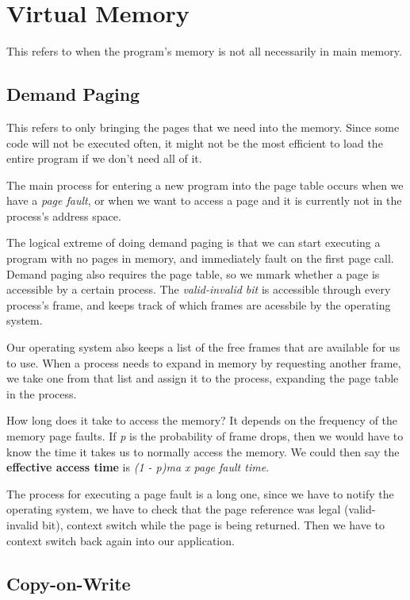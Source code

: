 \hypertarget{virtual-memory}{%
\section{Virtual Memory}\label{virtual-memory}}

This refers to when the program's memory is not all necessarily in main
memory.

\hypertarget{demand-paging}{%
\subsection{Demand Paging}\label{demand-paging}}

This refers to only bringing the pages that we need into the memory.
Since some code will not be executed often, it might not be the most
efficient to load the entire program if we don't need all of it.

The main process for entering a new program into the page table occurs
when we have a \emph{page fault}, or when we want to access a page and
it is currently not in the process's address space.

The logical extreme of doing demand paging is that we can start
executing a program with no pages in memory, and immediately fault on
the first page call. Demand paging also requires the page table, so we
mmark whether a page is accessible by a certain process. The
\emph{valid-invalid bit} is accessible through every process's frame,
and keeps track of which frames are acessbile by the operating system.

Our operating system also keeps a list of the free frames that are
available for us to use. When a process needs to expand in memory by
requesting another frame, we take one from that list and assign it to
the process, expanding the page table in the process.

How long does it take to access the memory? It depends on the frequency
of the memory page faults. If \emph{p} is the probability of frame
drops, then we would have to know the time it takes us to normally
access the memory. We could then say the \textbf{effective access time}
is \emph{(1 - p)ma x page fault time}.

The process for executing a page fault is a long one, since we have to
notify the operating system, we have to check that the page reference
was legal (valid-invalid bit), context switch while the page is being
returned. Then we have to context switch back again into our
application.

\hypertarget{copy-on-write}{%
\subsection{Copy-on-Write}\label{copy-on-write}}

